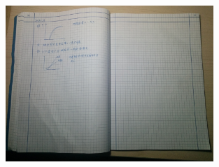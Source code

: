 \documentclass[aps,pre,12pt,preprint,onecolumn,showpacs,showkeys,UTF8]{revtex4-1}
\begin{document}
\begin{figure}[h]
	\begin{center}
		\includegraphics[width=0.7\textwidth]{pic11.jpg}
	\end{center}
\end{figure}
\end{document}
